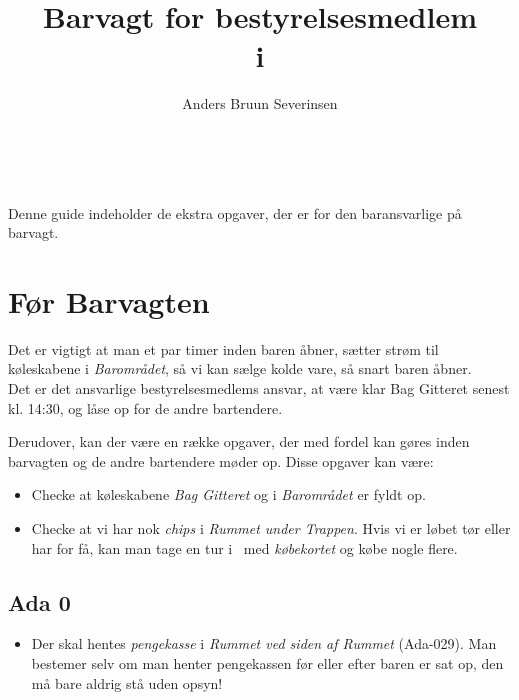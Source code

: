 

\title{Barvagt for bestyrelsesmedlem\\ i \fredagscafeen}
\date{}
\author{Anders Bruun Severinsen}



\maketitle

\tableofcontents \

Denne guide indeholder de ekstra opgaver, der er for den baransvarlige på barvagt.

\section{Før Barvagten}
\label{sec:pre-barvagten}

Det er vigtigt at man et par timer inden baren åbner, sætter strøm til køleskabene i
\textit{Barområdet}, så vi kan sælge kolde vare, så snart baren åbner.\\

Det er det ansvarlige bestyrelsesmedlems ansvar, at være klar Bag Gitteret senest kl. 14:30,
og låse op for de andre bartendere.

Derudover, kan der være en række opgaver, der med fordel kan gøres inden barvagten og de andre bartendere møder op.
Disse opgaver kan være:

\begin{itemize}
    \item Checke at køleskabene \textit{Bag Gitteret} og i \textit{Barområdet} er fyldt op. 
    \item Checke at vi har nok \textit{chips} i \textit{Rummet under Trappen}. 
    Hvis vi er løbet tør eller har for få, kan man tage en tur i \foetex\ med 
    \textit{købekortet} og købe nogle flere.
\end{itemize}

\subsection{Ada 0}
\label{sec:pre:ada}

\begin{itemize}
    \item Der skal hentes \textit{pengekasse} i \textit{Rummet ved siden af Rummet} 
    (Ada-029). Man bestemer selv om man henter pengekassen før eller efter baren er sat op, 
    den må bare aldrig stå uden opsyn!
\end{itemize}

